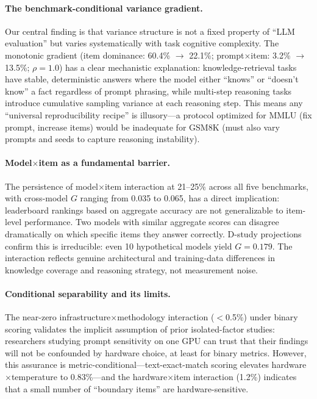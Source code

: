 \documentclass[letterpaper]{article}
\newcommand{\gcoeff}{\ensuremath{G}}
\newcommand{\pct}{\%}
\begin{document}
\paragraph{The benchmark-conditional variance gradient.}
Our central finding is that variance structure is not a fixed property of ``LLM evaluation'' but varies systematically with task cognitive complexity.
The monotonic gradient (item dominance: 60.4\pct{} $\to$ 22.1\pct{}; prompt$\times$item: 3.2\pct{} $\to$ 13.5\pct{}; $\rho = 1.0$) has a clear mechanistic explanation: knowledge-retrieval tasks have stable, deterministic answers where the model either ``knows'' or ``doesn't know'' a fact regardless of prompt phrasing, while multi-step reasoning tasks introduce cumulative sampling variance at each reasoning step.
This means any ``universal reproducibility recipe'' is illusory---a protocol optimized for MMLU (fix prompt, increase items) would be inadequate for GSM8K (must also vary prompts and seeds to capture reasoning instability).

\paragraph{Model$\times$item as a fundamental barrier.}
The persistence of model$\times$item interaction at 21--25\pct{} across all five benchmarks, with cross-model $\gcoeff{}$ ranging from 0.035 to 0.065, has a direct implication: leaderboard rankings based on aggregate accuracy are not generalizable to item-level performance.
Two models with similar aggregate scores can disagree dramatically on which specific items they answer correctly.
D-study projections confirm this is irreducible: even 10 hypothetical models yield $\gcoeff{} = 0.179$.
The interaction reflects genuine architectural and training-data differences in knowledge coverage and reasoning strategy, not measurement noise.

\paragraph{Conditional separability and its limits.}
The near-zero infrastructure$\times$methodology interaction ($<$0.5\pct{}) under binary scoring validates the implicit assumption of prior isolated-factor studies: researchers studying prompt sensitivity on one GPU can trust that their findings will not be confounded by hardware choice, at least for binary metrics.
However, this assurance is metric-conditional---text-exact-match scoring elevates hardware$\times$temperature to 0.83\pct{}---and the hardware$\times$item interaction (1.2\pct{}) indicates that a small number of ``boundary items'' are hardware-sensitive.
\end{document}
